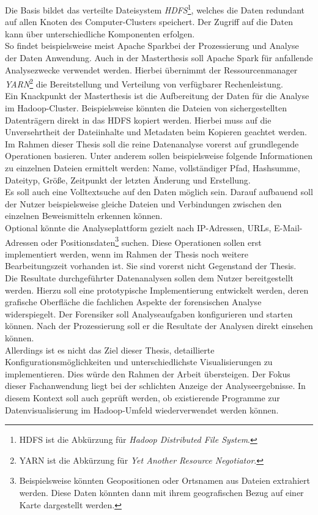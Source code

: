\noindent
Die Basis bildet das verteilte Dateisystem \textit{HDFS}\footnote{HDFS ist die Abkürzung für \textit{Hadoop Distributed File System}.}, welches die Daten redundant auf allen Knoten des Computer-Clusters speichert. Der Zugriff auf die Daten kann über unterschiedliche Komponenten erfolgen.\\
So findet beispielsweise meist Apache Spark\texttrademark\enspace bei der Prozessierung und Analyse der Daten Anwendung. Auch in der Masterthesis soll Apache Spark für anfallende Analysezwecke verwendet werden. Hierbei übernimmt der Ressourcenmanager \textit{YARN}\footnote{YARN ist die Abkürzung für \textit{Yet Another Resource Negotiator}.} die Bereitstellung und Verteilung von verfügbarer Rechenleistung.\\

\noindent
Ein Knackpunkt der Masterthesis ist die Aufbereitung der Daten für die Analyse im Hadoop-Cluster. Beispielsweise könnten die Dateien von sichergestellten Datenträgern direkt in das HDFS kopiert werden. Hierbei muss auf die Unversehrtheit der Dateiinhalte und Metadaten beim Kopieren geachtet werden. \\

\noindent
Im Rahmen dieser Thesis soll die reine Datenanalyse vorerst auf grundlegende Operationen basieren. Unter anderem sollen beispielsweise folgende Informationen zu einzelnen Dateien ermittelt werden: Name, vollständiger Pfad, Hashsumme, Dateityp, Größe, Zeitpunkt der letzten Änderung und Erstellung.\\
Es soll auch eine Volltextsuche auf den Daten möglich sein. Darauf aufbauend soll der Nutzer beispielsweise gleiche Dateien und Verbindungen zwischen den einzelnen Beweismitteln erkennen können.\\
Optional könnte die Analyseplattform gezielt nach IP-Adressen, URLs, E-Mail-Adressen oder Positionsdaten\footnote{Beispielsweise könnten Geopositionen oder Ortsnamen aus Dateien extrahiert werden. Diese Daten könnten dann mit ihrem geografischen Bezug auf einer Karte dargestellt werden.} suchen. Diese Operationen sollen erst implementiert werden, wenn im Rahmen der Thesis noch weitere Bearbeitungszeit vorhanden ist. Sie sind vorerst nicht Gegenstand der Thesis.\\

\noindent
Die Resultate durchgeführter Datenanalysen sollen dem Nutzer bereitgestellt werden. Hierzu soll eine prototypische Implementierung entwickelt werden, deren grafische Oberfläche die fachlichen Aspekte der forensischen Analyse widerspiegelt. Der Forensiker soll Analyseaufgaben konfigurieren und starten können. Nach der Prozessierung soll er die Resultate der Analysen direkt einsehen können.\\
Allerdings ist es nicht das Ziel dieser Thesis, detaillierte Konfigurationsmöglichkeiten und unterschiedlichste Visualisierungen zu implementieren. Dies würde den Rahmen der Arbeit übersteigen. Der Fokus dieser Fachanwendung liegt bei der schlichten Anzeige der Analyseergebnisse. In diesem Kontext soll auch geprüft werden, ob existierende Programme zur Datenvisualisierung im Hadoop-Umfeld wiederverwendet werden können.\\

